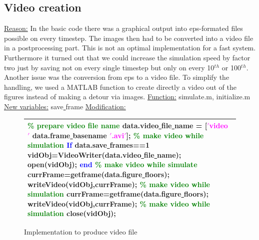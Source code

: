 \documentclass[11pt]{article}
\begin{document}
\newpage
\subsection{Video creation}
\underline{Reason:}
\newline
In the basic code there was a graphical output into eps-formated files possible on every timestep. The images then had to be converted into a video file in a postprocessing part. This is not an optimal implementation for a fast system. Furthermore it turned out that we could increase the simulation speed by factor two just by saving not on every single timestep but only on every 10$^t$$^h$ or 100$^t$$^h$. Another issue was the conversion from eps to a video file. To simplify the handling, we used a MATLAB function to create directly a video out of the figures instead of making a detour via images.
\newline
\underline{Function:}
\newline
simulate.m, initialize.m
\newline
\underline{New variables:}
\newline
save\underline{ }frame
\newline
\underline{Modification:}
\newline

\begin{figure}[H]
\centering
\begin{tabular}
{|>{\large}m{\textwidth}|} \hline
\bigskip
\textcolor{green}{\% prepare video file name}
\newline
data.video\underline{ }file\underline{ }name = [\textcolor{magenta}{$'$video\underline{ }$'$} data.frame\underline{ }basename \textcolor{magenta}{$'$.avi$'$}];
\newline
\newline
\textcolor{green}{\% make video while simulation}
\newline
\textcolor{blue}{If} data.save\underline{ }frames==1
\newline
             vidObj=VideoWriter(data.video\underline{ }file\underline{ }name);
\newline
             open(vidObj);
\newline
\textcolor{blue}{end}
\newline
\newline
\textcolor{green}{\% make video while simulate   }
\newline
currFrame=getframe(data.figure\underline{ }floors);
\newline
writeVideo(vidObj,currFrame);
\newline
\newline
\textcolor{green}{\% make video while simulation}
\newline
currFrame=getframe(data.figure\underline{ }floors);
\newline
writeVideo(vidObj,currFrame);
\newline
\newline
\textcolor{green}{\% make video while simulation}
\newline
close(vidObj);
\bigskip
\\ \hline
\end{tabular}
\caption{Implementation to produce video file}
\end{figure}
\end{document}
